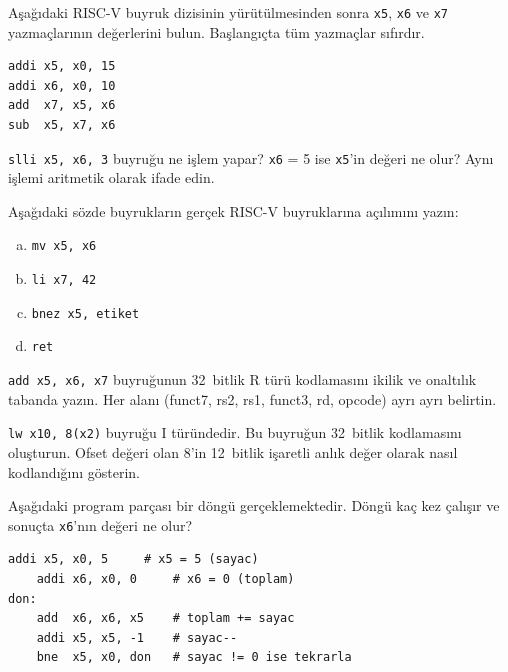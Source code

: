 \begin{alistirma}[\kolay]
Aşağıdaki RISC-V buyruk dizisinin yürütülmesinden sonra \texttt{x5}, \texttt{x6} ve \texttt{x7} yazmaçlarının değerlerini bulun. Başlangıçta tüm yazmaçlar sıfırdır.
\begin{lstlisting}[style=riscv, style=alistirma-kod]
addi x5, x0, 15
addi x6, x0, 10
add  x7, x5, x6
sub  x5, x7, x6
\end{lstlisting}
\end{alistirma}

\begin{alistirma}[\kolay]
\texttt{slli x5, x6, 3} buyruğu ne işlem yapar? \texttt{x6} = 5 ise \texttt{x5}'in değeri ne olur? Aynı işlemi aritmetik olarak ifade edin.
\end{alistirma}

\begin{alistirma}[\kolay]
Aşağıdaki sözde buyrukların gerçek RISC-V buyruklarına açılımını yazın:
\begin{enumerate}[(a)]
    \item \texttt{mv x5, x6}
    \item \texttt{li x7, 42}
    \item \texttt{bnez x5, etiket}
    \item \texttt{ret}
\end{enumerate}
\end{alistirma}

\begin{alistirma}[\orta]
\texttt{add x5, x6, x7} buyruğunun 32~bitlik R türü kodlamasını ikilik ve onaltılık tabanda yazın. Her alanı (funct7, rs2, rs1, funct3, rd, opcode) ayrı ayrı belirtin.
\end{alistirma}

\begin{alistirma}[\orta]
\texttt{lw x10, 8(x2)} buyruğu I türündedir. Bu buyruğun 32~bitlik kodlamasını oluşturun. Ofset değeri olan 8'in 12~bitlik işaretli anlık değer olarak nasıl kodlandığını gösterin.
\end{alistirma}

\begin{alistirma}[\orta]
Aşağıdaki program parçası bir döngü gerçeklemektedir. Döngü kaç kez çalışır ve sonuçta \texttt{x6}'nın değeri ne olur?
\begin{lstlisting}[style=riscv, style=alistirma-kod]
    addi x5, x0, 5     # x5 = 5 (sayac)
    addi x6, x0, 0     # x6 = 0 (toplam)
don:
    add  x6, x6, x5    # toplam += sayac
    addi x5, x5, -1    # sayac--
    bne  x5, x0, don   # sayac != 0 ise tekrarla
\end{lstlisting}
\end{alistirma}

